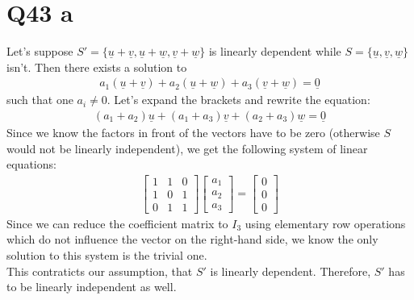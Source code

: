 \documentclass{article}
\renewcommand{\vec}{\underline}
\begin{document}
\section*{Q43 a}
Let's suppose $S'=\{\vec u+\vec v, \vec u+\vec w, \vec v+\vec w\}$ is linearly dependent 
while $S=\{\vec u, \vec v, \vec w\}$ isn't. Then there exists a solution to
\begin{align}
    a_1(\vec u+\vec v) + a_2(\vec u + \vec w) + a_3(\vec v + \vec w) = \vec 0
\end{align}
such that one $a_i\not=0$. Let's expand the brackets and rewrite the equation:
\begin{align}
    (a_1+a_2)\vec u + (a_1+a_3) \vec v + (a_2 + a_3) \vec w = \vec 0
\end{align}
Since we know the factors in front of the vectors have to be zero (otherwise $S$ would not be linearly independent), we get the following system of linear equations:
\begin{align}
    \begin{bmatrix}
        1 &1 &0\\
        1 &0 &1\\
        0 &1 &1
    \end{bmatrix}
    \begin{bmatrix}
        a_1\\a_2\\a_3
    \end{bmatrix}
    = \begin{bmatrix}
        0 \\ 0 \\ 0
    \end{bmatrix}
\end{align}
Since we can reduce the coefficient matrix to $I_3$ using elementary row operations which do not influence the vector on the right-hand side, we know the only solution to this system is the trivial one.\\
This contraticts our assumption, that $S'$ is linearly dependent. Therefore, $S'$ has to be linearly independent as well.
\end{document}
